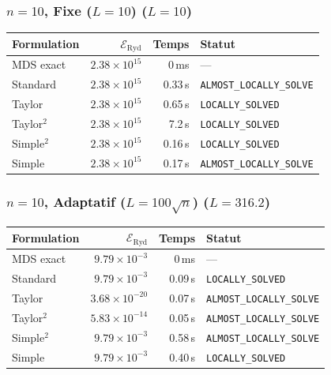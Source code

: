 \subsubsection{$n=10$, Fixe ($L{=}10$) ($L=10$)}
\begin{longtable}{@{}lrrl@{}}
  \toprule
  Formulation & $\mathcal{E}_{\mathrm{Ryd}}$ & Temps & Statut \\
  \midrule
  \endhead
  MDS exact & $2.38\times10^{15}$ & 0\,ms & --- \\
  Standard & $2.38\times10^{15}$ & 0.33\,s & \texttt{ALMOST\_LOCALLY\_SOLVE} \\
  Taylor & $2.38\times10^{15}$ & 0.65\,s & \texttt{LOCALLY\_SOLVED} \\
  Taylor$^2$ & $2.38\times10^{15}$ & 7.2\,s & \texttt{LOCALLY\_SOLVED} \\
  Simple$^2$ & $2.38\times10^{15}$ & 0.16\,s & \texttt{LOCALLY\_SOLVED} \\
  Simple & $2.38\times10^{15}$ & 0.17\,s & \texttt{ALMOST\_LOCALLY\_SOLVE} \\
  \bottomrule
\end{longtable}

\subsubsection{$n=10$, Adaptatif ($L{=}100\sqrt{n}$) ($L=316.2$)}
\begin{longtable}{@{}lrrl@{}}
  \toprule
  Formulation & $\mathcal{E}_{\mathrm{Ryd}}$ & Temps & Statut \\
  \midrule
  \endhead
  MDS exact & $9.79\times10^{-3}$ & 0\,ms & --- \\
  Standard & $9.79\times10^{-3}$ & 0.09\,s & \texttt{LOCALLY\_SOLVED} \\
  Taylor & $3.68\times10^{-20}$ & 0.07\,s & \texttt{ALMOST\_LOCALLY\_SOLVE} \\
  Taylor$^2$ & $5.83\times10^{-14}$ & 0.05\,s & \texttt{ALMOST\_LOCALLY\_SOLVE} \\
  Simple$^2$ & $9.79\times10^{-3}$ & 0.58\,s & \texttt{ALMOST\_LOCALLY\_SOLVE} \\
  Simple & $9.79\times10^{-3}$ & 0.40\,s & \texttt{LOCALLY\_SOLVED} \\
  \bottomrule
\end{longtable}

